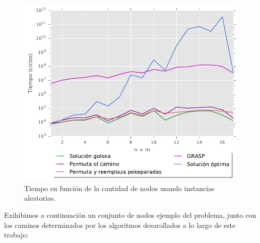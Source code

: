 \begin{figure}[H]
  \begin{center}
    \includegraphics{../experimentacion/ej5/expAleatOp_cantNodos_tiempo.pdf}
    \caption{Tiempo en funci\'on de la cantidad de nodos usando instancias aleatorias.}
    \label{fig:ej5_expAleatOp_cantNodos_tiempo}
  \end{center}
\end{figure}

Exihibimos a continuaci\'on un conjunto de nodos ejemplo del problema, junto con los caminos determinados por los algoritmos desarollados a lo largo de este trabajo:

